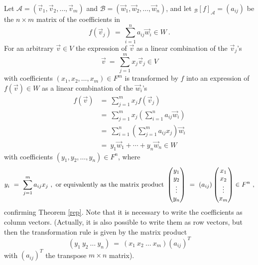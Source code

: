 \documentclass[11pt]{amsbook}
\theoremstyle{definition}
\begin{document}
Let $\mathcal{A}=(\vec{v}_1,\vec{v}_2,\dots,\vec{v}_m)$ and
$\mathcal{B}=(\vec{w}_1,\vec{w}_2,\dots,\vec{w}_n)$, and let
${}_\mathcal{B}[f]_{\mathcal{A}}=(a_{ij})$ be the $n \times m$ matrix
of the coefficients in
$$ f(\vec{v}_j)~=~\sum\limits^n_{i=1}a_{ij}\vec{w}_i \in W~.$$
For an arbitrary $\vec{v} \in V$ the expression of $\vec{v}$ as a linear combination of the $\vec{v}_j$'s
$$\vec{v}~=~\sum\limits^m_{j=1}x_j \vec{v}_j \in V$$
with coefficients $(x_1,x_2,\dots,x_m) \in F^m$ is transformed by $f$ into
an expression of $f(\vec{v}) \in W$ as a linear combination of the $\vec{w}_i$'s
$$\begin{array}{ll}
f(\vec{v})&=~\sum\limits^m_{j=1}x_j f(\vec{v}_j)\\[1ex]
&=~\sum\limits^m_{j=1}x_j (\sum\limits^n_{i=1}a_{ij}\vec{w}_i)\\[1ex]
&=~\sum\limits^n_{i=1}(\sum\limits^m_{j=1}a_{ij}x_j)\vec{w}_i \\[1ex]
&=~y_1 \vec{w}_1 + \cdots + y_n \vec{w}_n\in W
\end{array}$$
with coefficients $(y_1,y_2,\dots,y_n) \in F^n$, where
$$y_i~=~\sum\limits^m_{j=1}a_{ij}x_j~,~\hbox{or equivalently as the matrix product}~
\begin{pmatrix} y_1 \\ y_2 \\ \vdots \\ y_n \end{pmatrix}~=~
(a_{ij}) \begin{pmatrix} x_1 \\ x_2 \\ \vdots \\ x_m \end{pmatrix} \in F^n~,$$
confirming Theorem \ref{rep}.
Note that it is necessary to write the coefficients as column vectors. (Actually,
it is also possible to write them as row vectors, but then the transformation rule is given by the matrix product
$$(y_1~y_2~\dots~y_n)~=~(x_1~x_2~\dots~x_m)(a_{ij})^T$$
with $(a_{ij})^T$ the transpose $m \times n$ matrix).
\end{document}
